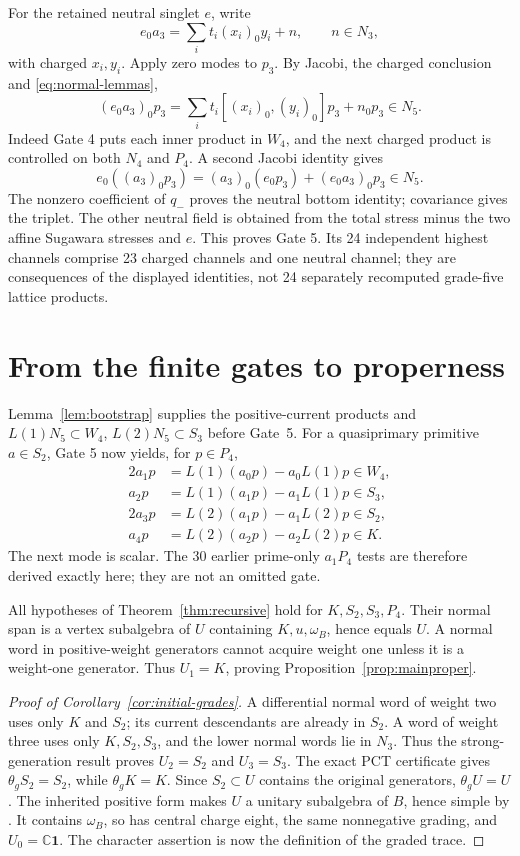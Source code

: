\documentclass[11pt,a4paper]{article}
\theoremstyle{definition}
\newcommand{\CC}{\mathbb C}
\newcommand{\one}{\mathbf1}
\begin{document}
For the retained neutral singlet \(e\), write
\[
 e_0a_3=\sum_i t_i(x_i)_0y_i+n,
 \qquad n\in N_3,
\]
with charged \(x_i,y_i\). Apply zero modes to \(p_3\). By Jacobi,
the charged conclusion and \eqref{eq:normal-lemmas},
\[
 (e_0a_3)_0p_3
 =\sum_i t_i[(x_i)_0,(y_i)_0]p_3+n_0p_3\in N_5.
\]
Indeed Gate 4 puts each inner product in \(W_4\), and the next charged
product is controlled on both \(N_4\) and \(P_4\). A second Jacobi
identity gives
\[
 e_0((a_3)_0p_3)=(a_3)_0(e_0p_3)+(e_0a_3)_0p_3\in N_5.
\]
The nonzero coefficient of \(q_-\) proves the neutral bottom identity;
covariance gives the triplet. The other neutral field is obtained from
the total stress minus the two affine Sugawara stresses and \(e\).
This proves Gate 5. Its 24 independent highest channels comprise
23 charged channels and one neutral channel; they are consequences
of the displayed identities, not 24 separately recomputed grade-five
lattice products.

\section{From the finite gates to properness}\label{sec:properness}
Lemma~\ref{lem:bootstrap} supplies the positive-current products and
$L(1)N_5\subset W_4$, $L(2)N_5\subset S_3$ before Gate~5.
For a quasiprimary primitive $a\in S_2$,
Gate 5 now yields, for \(p\in P_4\),
\begin{align*}
 2a_1p&=L(1)(a_0p)-a_0L(1)p\in W_4,\\
 a_2p&=L(1)(a_1p)-a_1L(1)p\in S_3,\\
 2a_3p&=L(2)(a_1p)-a_1L(2)p\in S_2,\\
 a_4p&=L(2)(a_2p)-a_2L(2)p\in K.
\end{align*}
The next mode is scalar. The 30 earlier prime-only \(a_1P_4\)
tests are therefore derived exactly here; they are not an omitted gate.

All hypotheses of Theorem~\ref{thm:recursive} hold for
\(K,S_2,S_3,P_4\). Their normal span is a vertex subalgebra of \(U\)
containing \(K,u,\omega_B\), hence equals \(U\). A normal word in
positive-weight generators cannot acquire weight one unless it is a
weight-one generator. Thus \(U_1=K\), proving
Proposition~\ref{prop:mainproper}.

\begin{proof}[Proof of Corollary~\ref{cor:initial-grades}]
A differential normal word of weight two uses only $K$ and $S_2$;
its current descendants are already in $S_2$. A word of weight three
uses only $K,S_2,S_3$, and the lower normal words lie in $N_3$.
Thus the strong-generation result proves $U_2=S_2$ and $U_3=S_3$.
The exact PCT certificate gives $\theta_gS_2=S_2$, while
$\theta_gK=K$. Since $S_2\subset U$ contains the original generators,
$\theta_gU=U$. The inherited positive form makes $U$ a unitary
subalgebra of $B$, hence simple by \cite[Proposition 5.29]{CKLW}.
It contains $\omega_B$, so has central charge eight, the same
nonnegative grading, and $U_0=\CC\one$. The character assertion is
now the definition of the graded trace.
\end{proof}
\end{document}

